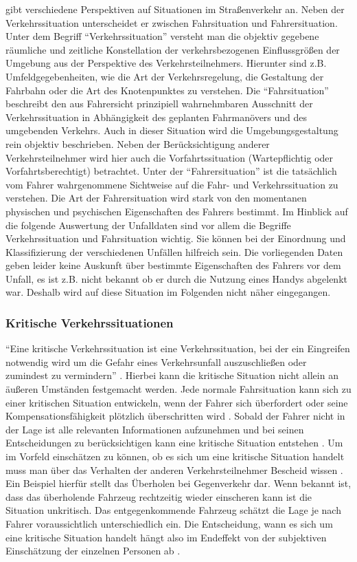 \Textcite[S.43]{Reichart.2001} gibt verschiedene Perspektiven auf Situationen im Straßenverkehr an. Neben der Verkehrssituation unterscheidet er zwischen Fahrsituation und Fahrersituation. Unter dem Begriff \enquote{Verkehrssituation} versteht man die objektiv gegebene räumliche und zeitliche Konstellation der verkehrsbezogenen Einflussgrößen der Umgebung aus der Perspektive des Verkehrsteilnehmers. Hierunter sind z.B. Umfeldgegebenheiten, wie die Art der Verkehrsregelung, die Gestaltung der Fahrbahn oder die Art des Knotenpunktes zu verstehen. Die \enquote{Fahrsituation} beschreibt den aus Fahrersicht prinzipiell wahrnehmbaren Ausschnitt der Verkehrssituation in Abhängigkeit des geplanten Fahrmanövers und des umgebenden Verkehrs. Auch in dieser Situation wird die Umgebungsgestaltung rein objektiv beschrieben. Neben der Berücksichtigung anderer Verkehrsteilnehmer wird hier auch die Vorfahrtssituation (Wartepflichtig oder Vorfahrtsberechtigt) betrachtet. Unter der \enquote{Fahrersituation} ist die tatsächlich vom Fahrer wahrgenommene Sichtweise auf die Fahr- und Verkehrssituation zu verstehen. Die Art der Fahrersituation wird stark von den momentanen physischen und psychischen Eigenschaften des Fahrers bestimmt. Im Hinblick auf die folgende Auswertung der Unfalldaten sind vor allem die Begriffe Verkehrssituation und Fahrsituation wichtig. Sie können bei der Einordnung und Klassifizierung der verschiedenen Unfällen hilfreich sein. Die vorliegenden Daten geben leider keine Auskunft über bestimmte Eigenschaften des Fahrers vor dem Unfall, es ist z.B. nicht bekannt ob er durch die Nutzung eines Handys abgelenkt war. Deshalb wird auf diese Situation im Folgenden nicht näher eingegangen.

\subsubsection{Kritische Verkehrssituationen}
\enquote{Eine kritische Verkehrssituation ist eine Verkehrssituation, bei der ein Eingreifen notwendig wird um die Gefahr eines Verkehrsunfall auszuschließen oder zumindest zu vermindern} \parencite[S. 4]{MockHecker.1994}. Hierbei kann die kritische Situation nicht allein an äußeren Umständen festgemacht werden. Jede normale Fahrsituation kann sich zu einer kritischen Situation entwickeln, wenn der Fahrer sich überfordert oder seine Kompensationsfähigkeit plötzlich überschritten wird \parencite[S. 76]{Bock.1989}. Sobald der Fahrer nicht in der Lage ist alle relevanten Informationen aufzunehmen und bei seinen Entscheidungen zu berücksichtigen kann eine kritische Situation entstehen \parencite[S. 2]{Gerstenberger.17.02.2015}. Um im Vorfeld einschätzen zu können, ob es sich um eine kritische Situation handelt muss man über das Verhalten der anderen Verkehrsteilnehmer Bescheid wissen \parencite[S. 3]{MockHecker.1994}. Ein Beispiel hierfür stellt das Überholen bei Gegenverkehr dar. Wenn bekannt ist, dass das überholende Fahrzeug rechtzeitig wieder einscheren kann ist die Situation unkritisch. Das entgegenkommende Fahrzeug schätzt die Lage je nach Fahrer voraussichtlich unterschiedlich ein. Die Entscheidung, wann es sich um eine kritische Situation handelt hängt also im Endeffekt von der subjektiven Einschätzung der einzelnen Personen ab \parencite[S. 39]{Gerstenberger.17.02.2015}.

